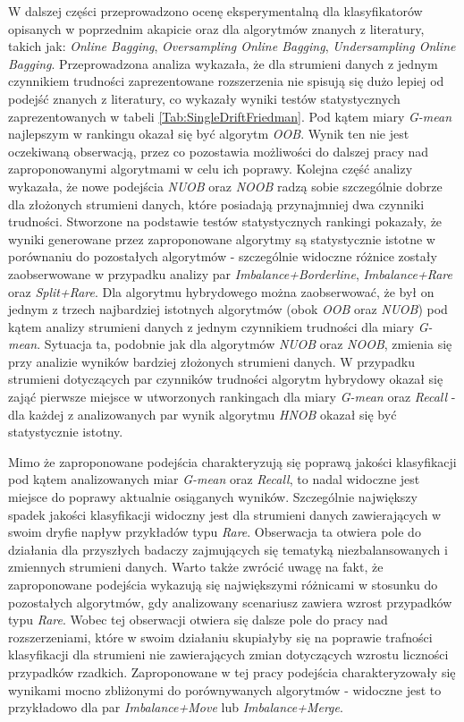 W dalszej części przeprowadzono ocenę eksperymentalną dla klasyfikatorów opisanych w poprzednim akapicie oraz dla algorytmów znanych z literatury, takich jak: \textit{Online Bagging}, \textit{Oversampling Online Bagging}, \textit{Undersampling Online Bagging}. Przeprowadzona analiza wykazała, że dla strumieni danych z jednym czynnikiem trudności zaprezentowane rozszerzenia nie spisują się dużo lepiej od podejść znanych z literatury, co wykazały wyniki testów statystycznych zaprezentowanych w tabeli \ref{Tab:SingleDriftFriedman}. Pod kątem miary \textit{G-mean} najlepszym w rankingu okazał się być algorytm \textit{OOB}. Wynik ten nie jest oczekiwaną obserwacją, przez co pozostawia możliwości do dalszej pracy nad zaproponowanymi algorytmami w celu ich poprawy. Kolejna część analizy wykazała, że nowe podejścia \textit{NUOB} oraz \textit{NOOB} radzą sobie szczególnie dobrze dla złożonych strumieni danych, które posiadają przynajmniej dwa czynniki trudności. Stworzone na podstawie testów statystycznych rankingi pokazały, że wyniki generowane przez zaproponowane algorytmy są statystycznie istotne w porównaniu do pozostałych algorytmów - szczególnie widoczne różnice zostały zaobserwowane w przypadku analizy par \textit{Imbalance+Borderline}, \textit{Imbalance+Rare} oraz \textit{Split+Rare}. Dla algorytmu hybrydowego można zaobserwować, że był on jednym z trzech najbardziej istotnych algorytmów (obok \textit{OOB} oraz \textit{NUOB}) pod kątem analizy strumieni danych z jednym czynnikiem trudności dla miary \textit{G-mean}. Sytuacja ta, podobnie jak dla algorytmów \textit{NUOB} oraz \textit{NOOB}, zmienia się przy analizie wyników bardziej złożonych strumieni danych. W przypadku strumieni dotyczących par czynników trudności algorytm hybrydowy okazał się zająć pierwsze miejsce w utworzonych rankingach dla miary \textit{G-mean} oraz \textit{Recall} - dla każdej z analizowanych par wynik algorytmu \textit{HNOB} okazał się być statystycznie istotny.

Mimo że zaproponowane podejścia charakteryzują się poprawą jakości klasyfikacji pod kątem analizowanych miar \textit{G-mean} oraz \textit{Recall}, to nadal widoczne jest miejsce do poprawy aktualnie osiąganych wyników. Szczególnie największy spadek jakości klasyfikacji widoczny jest dla strumieni danych zawierających w swoim dryfie napływ przykładów typu \textit{Rare}. Obserwacja ta otwiera pole do działania dla przyszłych badaczy zajmujących się tematyką niezbalansowanych i zmiennych strumieni danych. Warto także zwrócić uwagę na fakt, że zaproponowane podejścia wykazują się największymi różnicami w stosunku do pozostałych algorytmów, gdy analizowany scenariusz zawiera wzrost przypadków typu \textit{Rare}. Wobec tej obserwacji otwiera się dalsze pole do pracy nad rozszerzeniami, które w swoim działaniu skupiałyby się na poprawie trafności klasyfikacji dla strumieni nie zawierających zmian dotyczących wzrostu liczności przypadków rzadkich. Zaproponowane w tej pracy podejścia charakteryzowały się wynikami mocno zbliżonymi do porównywanych algorytmów - widoczne jest to przykładowo dla par \textit{Imbalance+Move} lub \textit{Imbalance+Merge}.


